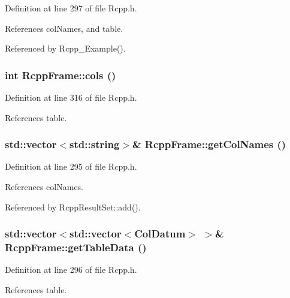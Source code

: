 Definition at line 297 of file Rcpp.h.

References colNames, and table.

Referenced by Rcpp\_\-Example().\hypertarget{classRcppFrame_ac33f787068fe1bc6f97b2b4e08c9c5d}{
\subsubsection[{cols}]{\setlength{\rightskip}{0pt plus 5cm}int RcppFrame::cols ()}}
\label{classRcppFrame_ac33f787068fe1bc6f97b2b4e08c9c5d}




Definition at line 316 of file Rcpp.h.

References table.\hypertarget{classRcppFrame_d220bfd289e745d13a99ffe323a00200}{
\subsubsection[{getColNames}]{\setlength{\rightskip}{0pt plus 5cm}std::vector$<$std::string$>$\& RcppFrame::getColNames ()}}
\label{classRcppFrame_d220bfd289e745d13a99ffe323a00200}




Definition at line 295 of file Rcpp.h.

References colNames.

Referenced by RcppResultSet::add().\hypertarget{classRcppFrame_3a0ac7b2822fc590f6f93ee775b134d0}{
\subsubsection[{getTableData}]{\setlength{\rightskip}{0pt plus 5cm}std::vector$<$std::vector$<${\bf ColDatum}$>$ $>$\& RcppFrame::getTableData ()}}
\label{classRcppFrame_3a0ac7b2822fc590f6f93ee775b134d0}




Definition at line 296 of file Rcpp.h.

References table.


